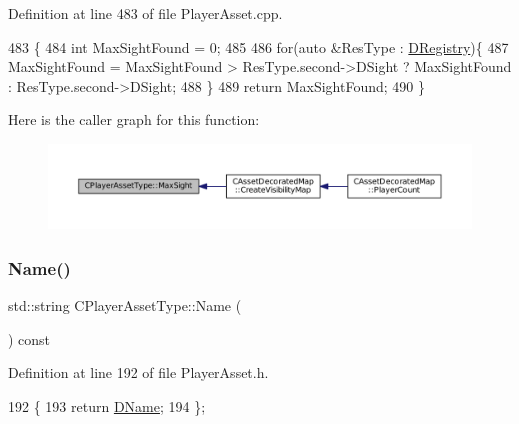 Definition at line 483 of file Player\+Asset.\+cpp.


\begin{DoxyCode}
483                               \{
484     \textcolor{keywordtype}{int} MaxSightFound = 0;
485     
486     \textcolor{keywordflow}{for}(\textcolor{keyword}{auto} &ResType : \hyperlink{classCPlayerAssetType_a24f4ccd06fbddacc936e31a2f1f12ed5}{DRegistry})\{
487         MaxSightFound = MaxSightFound > ResType.second->DSight ? MaxSightFound : ResType.second->DSight;
488     \}
489     \textcolor{keywordflow}{return} MaxSightFound;
490 \}
\end{DoxyCode}
Here is the caller graph for this function\+:
\nopagebreak
\begin{figure}[H]
\begin{center}
\leavevmode
\includegraphics[width=350pt]{classCPlayerAssetType_a1c1648ef0fdd2d112508c2ef9b7b70d1_icgraph}
\end{center}
\end{figure}
\hypertarget{classCPlayerAssetType_afd1b77119e34b459918551a08012ed35}{}\label{classCPlayerAssetType_afd1b77119e34b459918551a08012ed35} 
\subsubsection{\texorpdfstring{Name()}{Name()}}
{\footnotesize\ttfamily std\+::string C\+Player\+Asset\+Type\+::\+Name (\begin{DoxyParamCaption}{ }\end{DoxyParamCaption}) const\hspace{0.3cm}{\ttfamily [inline]}}



Definition at line 192 of file Player\+Asset.\+h.


\begin{DoxyCode}
192                               \{
193             \textcolor{keywordflow}{return} \hyperlink{classCPlayerAssetType_a95b557ce33af1aaecb26e8d78b0e2706}{DName};  
194         \};
\end{DoxyCode}
\hypertarget{classCPlayerAssetType_a42d55b6d7606e021c063fce3a14c56de}{}\label{classCPlayerAssetType_a42d55b6d7606e021c063fce3a14c56de} 
